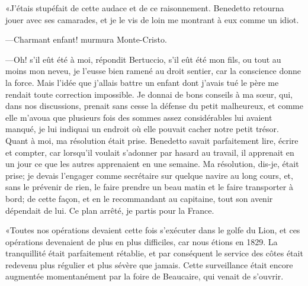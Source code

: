«J'étais stupéfait de cette audace et de ce raisonnement. Benedetto retourna jouer avec ses camarades, et je le vis de loin me montrant à eux comme un idiot. 

—Charmant enfant! murmura Monte-Cristo. 

—Oh! s'il eût été à moi, répondit Bertuccio, s'il eût été mon fils, ou tout au moins mon neveu, je l'eusse bien ramené au droit sentier, car la conscience donne la force. Mais l'idée que j'allais battre un enfant dont j'avais tué le père me rendait toute correction impossible. Je donnai de bons conseils à ma sœur, qui, dans nos discussions, prenait sans cesse la défense du petit malheureux, et comme elle m'avoua que plusieurs fois des sommes assez considérables lui avaient manqué, je lui indiquai un endroit où elle pouvait cacher notre petit trésor. Quant à moi, ma résolution était prise. Benedetto savait parfaitement lire, écrire et compter, car lorsqu'il voulait s'adonner par hasard au travail, il apprenait en un jour ce que les autres apprenaient en une semaine. Ma résolution, dis-je, était prise; je devais l'engager comme secrétaire sur quelque navire au long cours, et, sans le prévenir de rien, le faire prendre un beau matin et le faire transporter à bord; de cette façon, et en le recommandant au capitaine, tout son avenir dépendait de lui. Ce plan arrêté, je partis pour la France. 

«Toutes nos opérations devaient cette fois s'exécuter dans le golfe du Lion, et ces opérations devenaient de plus en plus difficiles, car nous étions en 1829. La tranquillité était parfaitement rétablie, et par conséquent le service des côtes était redevenu plus régulier et plus sévère que jamais. Cette surveillance était encore augmentée momentanément par la foire de Beaucaire, qui venait de s'ouvrir. 

